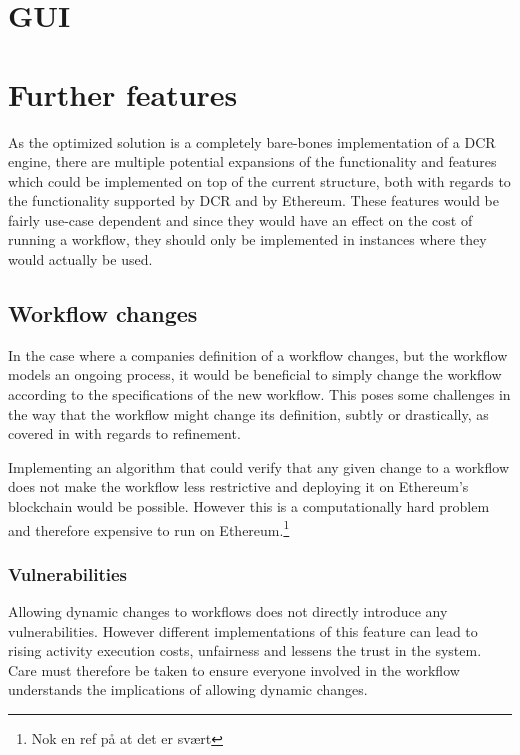 \documentclass{article}
\begin{document}
	\section{GUI}

	\section{Further features}
	As the optimized solution is a completely bare-bones implementation of a DCR engine, there are multiple potential expansions of the functionality and features which could be implemented on top of the current structure, both with regards to the functionality supported by DCR and by Ethereum.
	These features would be fairly use-case dependent and since they would have an effect on the cost of running a workflow, they should only be implemented in instances where they would actually be used.

		\subsection{Workflow changes}
		\label{sec:workflow-changes}

		In the case where a companies definition of a workflow changes, but the workflow models an ongoing process, it would be beneficial to simply change the workflow according to the specifications of the new workflow.
		This poses some challenges in the way that the workflow might change its definition, subtly or drastically, as covered in \cite{hierarchical-declarative-modelling} with regards to refinement.
		
		Implementing an algorithm that could verify that any given change to a workflow does not make the workflow less restrictive and deploying it on Ethereum's blockchain would be possible.
		However this is a computationally hard problem and therefore expensive to run on Ethereum.\footnote{Nok en ref på at det er svært}

			\subsubsection{Vulnerabilities}
			Allowing dynamic changes to workflows does not directly introduce any vulnerabilities. 
			However different implementations of this feature can lead to rising activity execution costs, unfairness and lessens the trust in the system. 
			Care must therefore be taken to ensure everyone involved in the workflow understands the implications of allowing dynamic changes.
\end{document}
